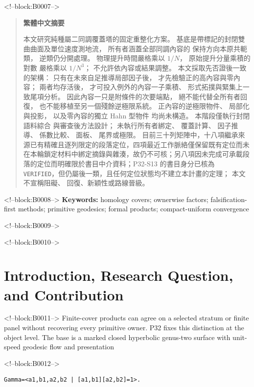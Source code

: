 \documentclass[11pt]{article}
\newenvironment{zhabstract}
  {\begin{quotation}\cjkfont\small\raggedright\noindent\textbf{繁體中文摘要}\par\smallskip\mdseries}
  {\end{quotation}}
\begin{document}
<!--block:B0007-->
\begin{zhabstract}
本文研究純種屬二同調覆蓋塔的固定重整化方案。 基底是帶標記的封閉雙曲曲面及單位速度測地流， 所有者涵蓋全部同調內容的 保持方向本原共軛類， 逆類仍分開處理。 物理提升時間嚴格乘以 $1/N$， 原始提升分量乘積的對數 嚴格乘以 $1/N^3$； 不允許依內容或結果調整。 本文採取先否證後一致的架構： 只有在未來自足推導局部因子後， 才先檢驗正的高內容與零內容； 兩者均存活後， 才可投入例外的內容一子乘積、 形式拓撲與緊集上一致尾項分析。 因此內容一只是附條件的次要端點， 絕不能代替全所有者回復， 也不能移植至另一個殘餘逆極限系統。 正內容的逆極限物件、 局部化與投影， 以及零內容的獨立 Hahn 型物件 均尚未構造。 本階段僅執行封閉語料綜合 與審查後方法設計； 未執行所有者綁定、 覆蓋計算、 因子推導、 係數比較、 面板、 尾界或極限。 目前三十列矩陣中，十八項繼承來源已有精確且逐列限定的段落定位，四項最近工作脈絡僅保留既有定位而未在本輪鎖定材料中綁定摘錄與雜湊，故仍不可核；另八項因未完成可承載段落的定位而明確限於書目中介資料；P32-S13 的書目身分已核為 \texttt{VERIFIED}，但仍屬後一類，且任何定位狀態均不建立本計畫的定理； 本文不宣稱阻礙、 回復、新穎性或路線晉級。
\end{zhabstract}

<!--block:B0008-->
\noindent\textbf{Keywords:} homology covers; ownerwise factors;
falsification-first methods; primitive geodesics; formal products;
compact-uniform convergence

<!--block:B0009-->
\medskip
{}

<!--block:B0010-->
\hypertarget{1-introduction-research-question-and-contribution}{%
\section{Introduction, Research Question, and
Contribution}\label{1-introduction-research-question-and-contribution}}

<!--block:B0011-->
Finite-cover products can agree on a selected stratum or finite panel
without recovering every primitive owner. P32 fixes this distinction at
the object level. The base is a marked closed hyperbolic genus-two
surface with unit-speed geodesic flow and presentation

<!--block:B0012-->
\begin{verbatim}
Gamma=<a1,b1,a2,b2 | [a1,b1][a2,b2]=1>.
\end{verbatim}
\end{document}
